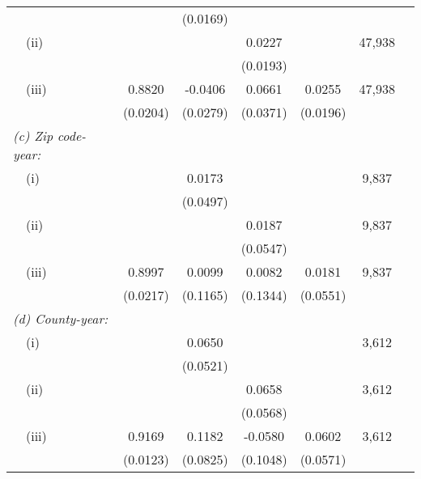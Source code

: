 \begin{table}
\begin{tabular}{@{}lcccccc@{}}
                                                             &       & (0.0169) &       &       &      \\
        $\quad$(ii)                                          &       &       &  0.0227  &       & 47,938 \\
                                                             &       &       & (0.0193) &       &      \\
        $\quad$(iii)                                         &  0.8820  &  -0.0406  &  0.0661  &  0.0255  & 47,938 \\
                                                             & (0.0204) & (0.0279) & (0.0371) & (0.0196) &      \\
        \textit{(c) Zip code-year:}                          &       &       &       &       &      \\
        $\quad$(i)                                           &       &  0.0173  &       &       & 9,837 \\
                                                             &       & (0.0497) &       &       &      \\
        $\quad$(ii)                                          &       &       &  0.0187  &       & 9,837 \\
                                                             &       &       & (0.0547) &       &      \\
        $\quad$(iii)                                         &  0.8997  &  0.0099  &  0.0082  &  0.0181  & 9,837 \\
                                                             & (0.0217) & (0.1165) & (0.1344) & (0.0551) &      \\
         \textit{(d) County-year:}                           &       &       &       &       &      \\
        $\quad$(i)                                           &       &  0.0650  &       &       & 3,612 \\
                                                             &       & (0.0521) &       &       &      \\
        $\quad$(ii)                                          &       &       &  0.0658  &       & 3,612 \\
                                                             &       &       & (0.0568) &       &      \\
        $\quad$(iii)                                         &  0.9169  &  0.1182  &  -0.0580  &  0.0602  & 3,612 \\
                                                             & (0.0123) & (0.0825) & (0.1048) & (0.0571) &      \\ \bottomrule
    \end{tabular}


\end{table}
